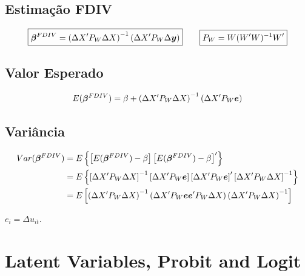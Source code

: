 \documentclass[11pt,oneside,a4paper]{article}
\numberwithin{equation}{section}
\begin{document}
\begin{description}
\begin{description}
\subsection*{Estimação FDIV}

\vspace{-1 em}
\begin{align*}
\boxed{
\boldsymbol{\beta}^{FDIV} =  
\left(
\Delta X' P_{W} \Delta X 
\right)^{-1}
\left(
\Delta X' P_{W} \Delta \boldsymbol{y}
\right)
}
\qquad
\boxed{
P_{W} = W(W'W)^{-1}W'}
\end{align*}

\subsection*{Valor Esperado}

\vspace{-1 em}
\begin{align*}
E( \boldsymbol{\beta}^{FDIV} ) =  
\beta + 
\left( \Delta X' P_{W} \Delta X \right)^{-1}
\left( \Delta X' P_{W} \boldsymbol{e} \right)
\end{align*}

\subsection*{Variância}

\vspace{-1 em}
\begin{align*}
Var( \boldsymbol{\beta}^{FDIV} ) &=
E\left\{  
\left[ E( \boldsymbol{\beta}^{FDIV} ) - \beta \right] 
\left[ E( \boldsymbol{\beta}^{FDIV} ) - \beta \right]'
\right\}
\\
&=
E\left\{  
\left[ \Delta X' P_{W} \Delta X \right]^{-1}
\left[ \Delta X' P_{W} \boldsymbol{e} \right]
\left[ \Delta X' P_{W} \boldsymbol{e} \right]'
\left[ \Delta X' P_{W} \Delta X \right]^{-1}
\right\}
\\
&=
E\left[
\left( \Delta X' P_{W} \Delta X \right)^{-1}
\left( \Delta X' P_{W} \boldsymbol{e} \boldsymbol{e}' P_{W} \Delta X \right)
\left( \Delta X' P_{W} \Delta X \right)^{-1}
\right]
\end{align*}

\noindent
$e_{i} = \Delta u_{it}$.

\clearpage
\section{Latent Variables, Probit and Logit}


\end{description}
\end{description}
\end{document}
